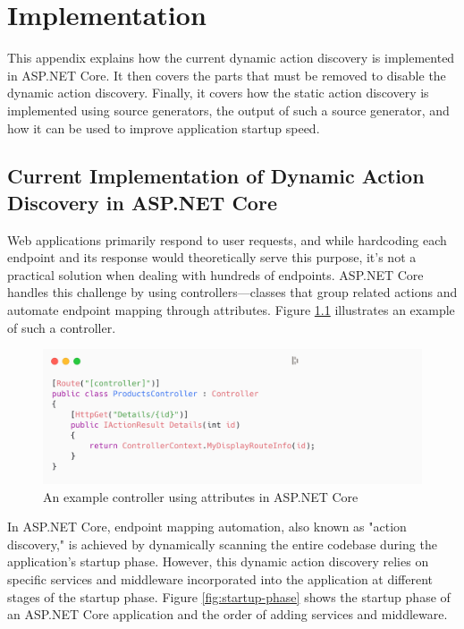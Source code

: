 \chapter{Implementation} \label{appendix:implementation}

This appendix explains how the current dynamic action discovery is implemented in ASP.NET Core. It then covers the parts that must be removed to disable the dynamic action discovery. Finally, it covers how the static action discovery is implemented using source generators, the output of such a source generator, and how it can be used to improve application startup speed.

\section{Current Implementation of Dynamic Action Discovery in ASP.NET Core}

Web applications primarily respond to user requests, and while hardcoding each endpoint and its response would theoretically serve this purpose, it's not a practical solution when dealing with hundreds of endpoints. ASP.NET Core handles this challenge by using controllers—classes that group related actions and automate endpoint mapping through attributes. Figure \ref{fig:controller} illustrates an example of such a controller.

\begin{figure}[H]
\centering
\includegraphics[width=1\textwidth]{graphics/attribute-routing.png}
\caption{An example controller using attributes in ASP.NET Core}
\label{fig:controller}
\end{figure}

In ASP.NET Core, endpoint mapping automation, also known as "action discovery," is achieved by dynamically scanning the entire codebase during the application's startup phase. However, this dynamic action discovery relies on specific services and middleware incorporated into the application at different stages of the startup phase. Figure \ref{fig:startup-phase} shows the startup phase of an ASP.NET Core application and the order of adding services and middleware.

